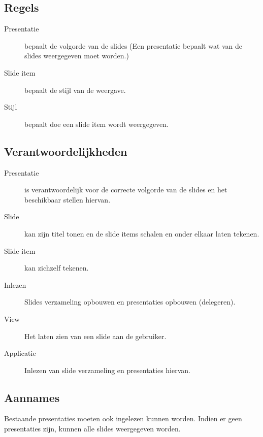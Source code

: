 \documentclass[a4paper]{article}
\begin{document}
\subsection{Regels}
\begin{description}
\item[Presentatie] bepaalt de volgorde van de slides
(Een presentatie bepaalt wat van de slides weergegeven moet worden.)
\item[Slide item] bepaalt de stijl van de weergave.
\item[Stijl] bepaalt doe een slide item wordt weergegeven. 
\end{description}

\subsection{Verantwoordelijkheden}
\begin{description}
\item[Presentatie] is verantwoordelijk voor de correcte volgorde van de slides en het beschikbaar stellen hiervan. 
\item[Slide] kan zijn titel tonen en de slide items schalen en onder elkaar laten tekenen.
\item[Slide item] kan zichzelf tekenen.
\item[Inlezen] Slides verzameling opbouwen en presentaties opbouwen (delegeren).
\item[View] Het laten zien van een slide aan de gebruiker.
\item[Applicatie] Inlezen van slide verzameling en presentaties hiervan.
\end{description}

\subsection{Aannames}
Bestaande presentaties moeten ook ingelezen kunnen worden. Indien er geen presentaties zijn, kunnen alle slides weergegeven worden.
\end{document}
